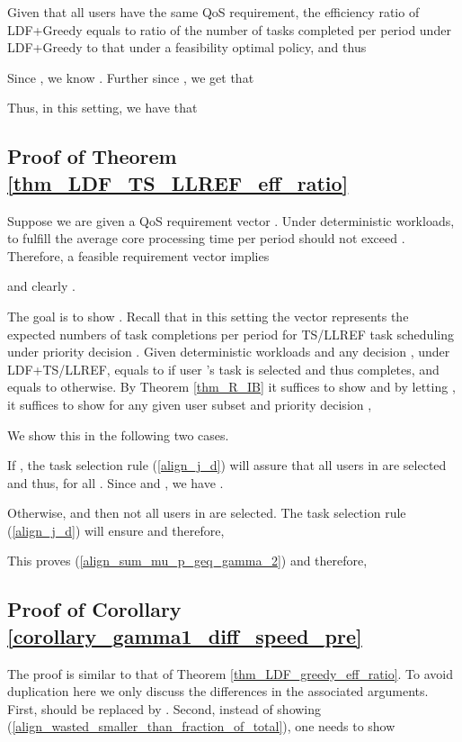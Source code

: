 \documentclass[prodmode,acmtompecs]{acmsmall}
\newcommand{\myComments}[1]{}
\newif\iftompecsextended
\newcommand{\tompecsextendedStart}{\iftompecsextended  \myComments{TOMPECS extended version: }}
\begin{document}
Given that all users have the same QoS requirement, the efficiency ratio of LDF+Greedy equals to ratio of the number of tasks completed per period under LDF+Greedy to that under a feasibility optimal policy, and thus


Since , we know . Further since , we get that


Thus, in this setting, we have that


\subsection{Proof of Theorem \ref{thm_LDF_TS_LLREF_eff_ratio}}
\label{appendix_pf_thm_LDF_TS_LLREF_eff_ratio}
Suppose we are given a QoS requirement vector . Under deterministic workloads, to fulfill  the average core processing time  per period should not exceed . Therefore, a feasible requirement vector  implies 

and clearly . 

The goal is to show . Recall that in this setting the vector  represents the expected numbers of task completions per period for TS/LLREF task scheduling under priority decision . Given deterministic workloads and any decision , under LDF+TS/LLREF,  equals to  if user 's task is selected and thus completes, and equals to  otherwise. By Theorem \ref{thm_R_IB} it suffices to show  and by letting , it suffices to show for any given user subset  and priority decision , 


We show this in the following two cases. 

If , the task selection rule (\ref{align_j_d}) will assure that all users in  are selected and thus,  for all . Since  and , we have 
. 

Otherwise,  and then not all users in  are selected. 
The task selection rule (\ref{align_j_d}) will ensure 
 and therefore, 


This proves (\ref{align_sum_mu_p_geq_gamma_2}) and therefore, 


\tompecsextendedStart
\subsection{Proof of Corollary \ref{corollary_gamma1_diff_speed_pre}}
\label{appendix_pf_gamma1_diff_speed_pre}
The proof is similar to that of Theorem \ref{thm_LDF_greedy_eff_ratio}. 
To avoid duplication here we only discuss the differences in the associated arguments. 
First,  should be replaced by . 
Second, instead of showing (\ref{align_wasted_smaller_than_fraction_of_total}), one needs to show
\end{document}
